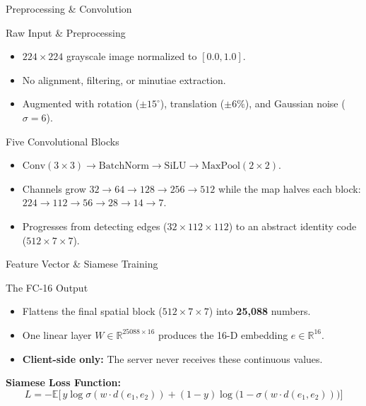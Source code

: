 \documentclass{beamer}
\begin{document}

\begin{frame}{Preprocessing \& Convolution}
  \begin{block}{Raw Input \& Preprocessing}
    \begin{itemize}
      \item $224\times224$ grayscale image normalized to $[0.0, 1.0]$.
      \item No alignment, filtering, or minutiae extraction.
      \item Augmented with rotation ($\pm15^\circ$), translation ($\pm6\%$), and Gaussian noise ($\sigma=6$).
    \end{itemize}
  \end{block}

  \begin{block}{Five Convolutional Blocks}
    \begin{itemize}
      \item $\text{Conv}(3\times3) \to \text{BatchNorm} \to \text{SiLU} \to \text{MaxPool}(2\times2)$.
      \item Channels grow $32\to64\to128\to256\to512$ while the map halves each block: $224\to112\to56\to28\to14\to7$.
      \item Progresses from detecting edges ($32\times112\times112$) to an abstract identity code ($512\times7\times7$).
    \end{itemize}
  \end{block}
\end{frame}

\begin{frame}{Feature Vector \& Siamese Training}
  \begin{block}{The FC-16 Output}
    \begin{itemize}
      \item Flattens the final spatial block ($512\times7\times7$) into \textbf{25,088} numbers.
      \item One linear layer $W \in \mathbb{R}^{25088\times16}$ produces the 16-D embedding $e \in \mathbb{R}^{16}$.
      \item \textbf{Client-side only:} The server never receives these continuous values.
    \end{itemize}
  \end{block}
  
  \vspace{0.3cm}
  \textbf{Siamese Loss Function:}
  \[
   L = -\mathbb{E}\big[\,y\log\sigma(w\cdot d(e_1,e_2)) + (1-y)\log\big(1-\sigma(w\cdot d(e_1,e_2))\big)\big]
  \]
\end{frame}
\end{document}
